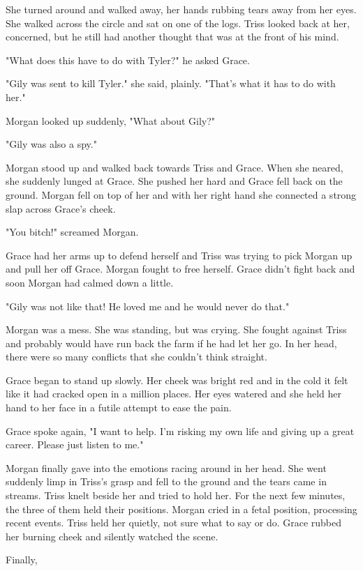 \documentclass[courier]{sffms}
\begin{document}
She turned around and walked away, her
hands rubbing tears away from her eyes.
She walked across the circle and sat on one
of the logs. Triss looked back at her, concerned,
but he still had another thought
that was at the front
of his mind.

"What does this have to do with Tyler?" he asked
Grace.

"Gily was sent to kill Tyler." she said, plainly.
"That's what it has to do with her."

Morgan looked up suddenly, "What about Gily?"

"Gily was also a spy."

Morgan stood up and walked back towards
Triss and Grace. When she neared, she suddenly lunged
at Grace. She pushed her hard and Grace fell back on
the ground. Morgan fell on top of her and with her right
hand she connected a strong slap across Grace's cheek.

"You bitch!" screamed Morgan.

Grace had her arms up to defend herself and Triss
was trying to pick Morgan up and pull her off Grace.
Morgan fought to free herself. Grace didn't fight
back and soon Morgan had calmed down a little.

"Gily was not like that! He loved me and he would
never do that."

Morgan was a mess. She was standing, but was
crying. She fought against Triss and probably
would have run back the farm if he had let
her go. In her head, there were so many conflicts
that she couldn't think straight.

Grace began to stand up slowly. Her cheek was
bright red and in the cold it felt like it had cracked
open in a million places. Her eyes watered and 
she held her hand to her face in a futile attempt
to ease the pain.

Grace spoke again, "I want to help. I'm risking
my own life and giving up a great career. Please
just listen to me."

Morgan finally gave into the emotions racing around
in her head. She went suddenly limp in Triss's grasp
and fell to the ground and the tears came in streams.
Triss knelt beside her and tried to hold her. For the
next few minutes, the three of them held their
positions. Morgan cried in a fetal position, processing
recent events. Triss held her quietly, not sure what
to say or do. Grace rubbed her burning cheek and
silently watched the scene.

Finally, 
\end{document}
